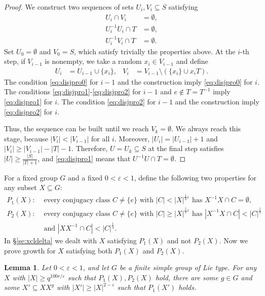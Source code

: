 \documentclass[a4paper]{article}
\newtheorem{lemma}[proposition]{Lemma}
\theoremstyle{definition}
\numberwithin{equation}{section}
\begin{document}
\begin{proof}
We construct two sequences of sets $U_{i},V_{i}\subseteq S$ satisfying
\begin{align}
U_{i}\cap V_{i} & =\emptyset, \label{eq:disjpro0} \\
U_{i}^{-1}U_{i}\cap T & =\emptyset, \label{eq:disjpro1} \\
U_{i}^{-1}V_{i}\cap T & =\emptyset. \label{eq:disjpro2}
\end{align}
Set $U_{0}=\emptyset$ and $V_{0}=S$, which satisfy trivially the properties above. At the $i$-th step, if $V_{i-1}$ is nonempty, we take a random $x_{i}\in V_{i-1}$ and define
\begin{align*}
U_{i} & =U_{i-1}\cup\{x_{i}\}, & V_{i} & =V_{i-1}\setminus(\{x_{i}\}\cup x_{i}T).
\end{align*}
The condition \eqref{eq:disjpro0} for $i-1$ and the construction imply \eqref{eq:disjpro0} for $i$. The conditions \eqref{eq:disjpro1}-\eqref{eq:disjpro2} for $i-1$ and $e\notin T=T^{-1}$ imply \eqref{eq:disjpro1} for $i$. The condition \eqref{eq:disjpro2} for $i-1$ and the construction imply \eqref{eq:disjpro2} for $i$.

Thus, the sequence can be built until we reach $V_{k}=\emptyset$. We always reach this stage, because $|V_{i}|<|V_{i-1}|$ for all $i$. Moreover, $|U_{i}|=|U_{i-1}|+1$ and $|V_{i}|\geq|V_{i-1}|-|T|-1$. Therefore, $U=U_{k}\subseteq S$ at the final step satisfies $|U|\geq\frac{|S|}{|T|+1}$, and \eqref{eq:disjpro1} means that $U^{-1}U\cap T=\emptyset$.
\end{proof}

For a fixed group $G$ and a fixed $0<\varepsilon<1$, define the following two properties for any subset $X\subseteq G$:
\begin{align*}
P_{1}(X): & \text{ every conjugacy class $C\neq\{e\}$ with $|C|<|X|^{\frac{1}{3}\varepsilon}$ has $X^{-1}X\cap C=\emptyset$,} \\
P_{2}(X): & \text{ every conjugacy class $C\neq\{e\}$ with $|C|\geq|X|^{\frac{1}{3}\varepsilon}$ has $|X^{-1}X\cap C|<|C|^{\frac{1}{4}}$} \\
& \text{ and $|XX^{-1}\cap C|<|C|^{\frac{1}{4}}$.}
\end{align*}
In \S\ref{se:xcldelta} we dealt with $X$ satisfying $P_{1}(X)$ and not $P_{2}(X)$. Now we prove growth for $X$ satisfying both $P_{1}(X)$ and $P_{2}(X)$.

\begin{lemma}\label{le:xclsmall}
Let $0<\varepsilon<1$, and let $G$ be a finite simple group of Lie type. For any $X$ with $|X|\geq q^{100r/\varepsilon}$ such that $P_{1}(X),P_{2}(X)$ hold, there are some $g\in G$ and some $X'\subseteq XX^{g}$ with $|X'|\geq|X|^{2-\varepsilon}$ such that $P_{1}(X')$ holds.
\end{lemma}
\end{document}
